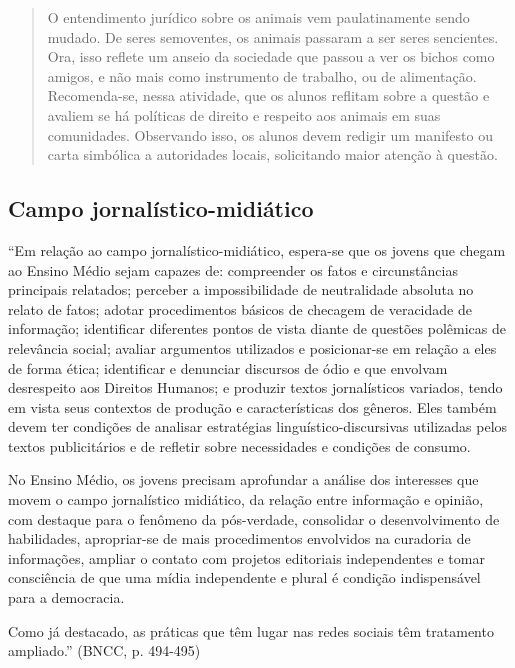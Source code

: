 \documentclass[12pt]{extarticle}
\begin{document}
\begin{quote}
O entendimento jurídico sobre os animais vem paulatinamente sendo
mudado. De seres semoventes, os animais passaram a ser seres sencientes.
Ora, isso reflete um anseio da sociedade que passou a ver os bichos como
amigos, e não mais como instrumento de trabalho, ou de alimentação.
Recomenda-se, nessa atividade, que os alunos reflitam sobre a questão e
avaliem se há políticas de direito e respeito aos animais em suas
comunidades. Observando isso, os alunos devem redigir um manifesto ou
carta simbólica a autoridades locais, solicitando maior atenção à
questão.
\end{quote}

\subsection{Campo jornalístico-midiático }

``Em relação ao campo jornalístico-midiático, espera-se que os jovens
que chegam ao Ensino Médio sejam capazes de: compreender os fatos e
circunstâncias principais relatados; perceber a impossibilidade de
neutralidade absoluta no relato de fatos; adotar procedimentos básicos
de checagem de veracidade de informação; identificar diferentes pontos
de vista diante de questões polêmicas de relevância social; avaliar
argumentos utilizados e posicionar-se em relação a eles de forma ética;
identificar e denunciar discursos de ódio e que envolvam desrespeito aos
Direitos Humanos; e produzir textos jornalísticos variados, tendo em
vista seus contextos de produção e características dos gêneros. Eles
também devem ter condições de analisar estratégias
linguístico-discursivas utilizadas pelos textos publicitários e de
refletir sobre necessidades e condições de consumo.

No Ensino Médio, os jovens precisam aprofundar a análise dos interesses
que movem o campo jornalístico midiático, da relação entre informação e
opinião, com destaque para o fenômeno da pós-verdade, consolidar o
desenvolvimento de habilidades, apropriar-se de mais procedimentos
envolvidos na curadoria de informações, ampliar o contato com projetos
editoriais independentes e tomar consciência de que uma mídia
independente e plural é condição indispensável para a democracia.

Como já destacado, as práticas que têm lugar nas redes sociais têm
tratamento ampliado.'' (BNCC, p. 494-495)
\end{document}
